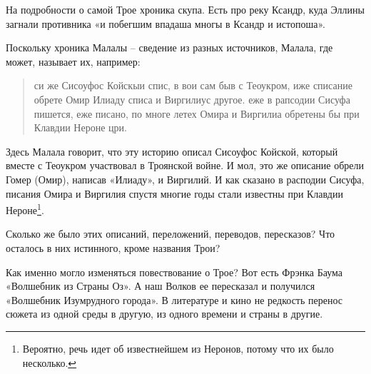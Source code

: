 На подробности о самой Трое хроника скупа. Есть про реку Ксандр, куда Эллины загнали противника «и побегшим впадаша многы в Ксандр и истопоша».

Поскольку хроника Малалы – сведение из разных источников, Малала, где может, называет их, например:

\begin{quotation}
си же Сисоуфос Койскыи спис, в вои сам быв с Теоукром, иже списание обрете Омир Илиаду списа и Виргилиус другое. еже в рапсодии Сисуфа пишется, еже писано, по многе летех Омира и Виргилиа обретены бы при Клавдии Нероне цри.
\end{quotation}

Здесь Малала говорит, что эту историю описал Сисоуфос Койской, который вместе с Теоукром участвовал в Троянской войне. И мол, это же описание обрели Гомер (Омир), написав «Илиаду», и Виргилий. И как сказано в расподии Сисуфа, писания Омира и Виргилия спустя многие годы стали известны при Клавдии Нероне\footnote{Вероятно, речь идет об известнейшем из Неронов, потому что их было несколько.}.

Сколько же было этих описаний, переложений, переводов, пересказов? Что осталось в них истинного, кроме названия Трои? 

Как именно могло изменяться повествование о Трое? Вот есть Фрэнка Баума «Волшебник из Страны Оз». А наш Волков ее пересказал и получился «Волшебник Изумрудного города». В литературе и кино не редкость перенос сюжета из одной среды в другую, из одного времени и страны в другие.
